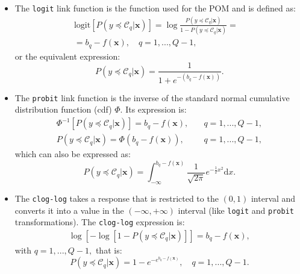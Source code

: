 \documentclass[journal]{IEEEtran}
\begin{document}
	\begin{itemize}
		\item The \texttt{logit} link function is the function used for the POM and is defined as:
		\begin{equation}
		\nonumber
		\begin{aligned}
		\text{logit}[P(y \preceq \mathcal{C}_q | \mathbf{x})] = \log\frac{P(y \preceq \mathcal{C}_q | \mathbf{x})}{1 - P(y \preceq \mathcal{C}_q | \mathbf{x})}=& \\ = b_q - f(\mathbf{x}), \quad q = 1, ..., Q-1,
		\end{aligned}
		\label{eq:logit}
		\end{equation}		
		or the equivalent expression:		
		\begin{equation}
		\nonumber
		P(y \preceq \mathcal{C}_q | \mathbf{x}) = \frac{1}{1 + e^{-(b_q - f(\mathbf{x}))}}.
		\label{eq:logit2}
		\end{equation}
		
		\item The \texttt{probit} link function is the inverse of the standard normal cumulative distribution function (cdf) $\Phi$. Its expression is:
		\begin{equation}
		\nonumber
		\begin{aligned}
		\Phi^{-1}[P(y \preceq \mathcal{C}_q | \mathbf{x})] = b_q - f(\mathbf{x}), \quad &q = 1, ..., Q-1,\\
		P(y \preceq \mathcal{C}_q | \mathbf{x}) = \Phi(b_q - f(\mathbf{x})), \quad &q = 1, ..., Q-1,
		\end{aligned}
		\label{eq:probit}
		\end{equation}		
		which can also be expressed as:
		\begin{equation}
		\nonumber
		P(y \preceq \mathcal{C}_q | \mathbf{x}) = \int_{-\infty}^{b_q - f(\mathbf{x})} \frac{1}{\sqrt{2\pi}} e^{-\frac{1}{2}x^2} \mathrm{d}x.
		\label{eq:probit2}
		\end{equation}
		
		\item The \texttt{clog-log} takes a response that is restricted to the $(0,1)$ interval and converts it into a value in the $(-\infty, +\infty)$ interval (like \texttt{logit} and \texttt{probit} transformations). The \texttt{clog-log} expression is:
		\begin{equation}
		\nonumber
		\begin{aligned}
		\log[-\log[1 - P(y \preceq \mathcal{C}_q | \mathbf{x})]] =b_q - f(\mathbf{x}),
		\end{aligned}
		\label{eq:cloglog}
		\end{equation}
		with $q = 1, ..., Q-1,$ that is:
		\begin{equation}
		\nonumber
		P(y \preceq \mathcal{C}_q | \mathbf{x}) = 1 - e^{-e^{b_q - f(\mathbf{x})}}, \quad q = 1, ..., Q-1.
		\label{eq:cloglog2}
		\end{equation}
	\end{itemize}
	
\end{document}
